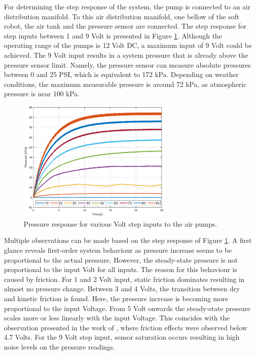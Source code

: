 For determining the step response of the system, the pump is connected to an air distribution manifold. To this air distribution manifold, one bellow of the soft robot, the air tank and the pressure sensor are connected. The step response for step inputs between 1 and 9 Volt is presented in Figure \ref{fig3:pump_dynamics_adapted}. Although the operating range of the pumps is 12 Volt DC, a maximum input of 9 Volt could be achieved. The 9 Volt input results in a system pressure that is already above the pressure sensor limit. Namely, the pressure sensor can measure absolute pressures between 0 and 25 PSI, which is equivalent to 172 kPa. Depending on weather conditions, the maximum measurable pressure is around 72 kPa, as atmospheric pressure is near 100 kPa.

\begin{figure}[H]
    \centering
    \includegraphics[width = 0.67\textwidth]{Figures/Chapter3/presstep.eps}
    \caption{Pressure response for various Volt step inputs to the air pumps.}
    \label{fig3:pump_dynamics_adapted}
\end{figure}


Multiple observations can be made based on the step response of Figure \ref{fig3:pump_dynamics_adapted}. A first glance reveals first-order system behaviour as pressure increase seems to be proportional to the actual pressure. However, the steady-state pressure is not proportional to the input Volt for all inputs. The reason for this behaviour is caused by friction. For 1 and 2 Volt input, static friction dominates resulting in almost no pressure change. Between 3 and 4 Volts, the transition between dry and kinetic friction is found. Here, the pressure increase is becoming more proportional to the input Voltage. From 5 Volt onwards the steady-state pressure scales more or less linearly with the input Voltage. This coincides with the observation presented in the work of \cite{berkers}, where friction effects were observed below 4.7 Volts. For the 9 Volt step input, sensor saturation occurs resulting in high noise levels on the pressure readings.

